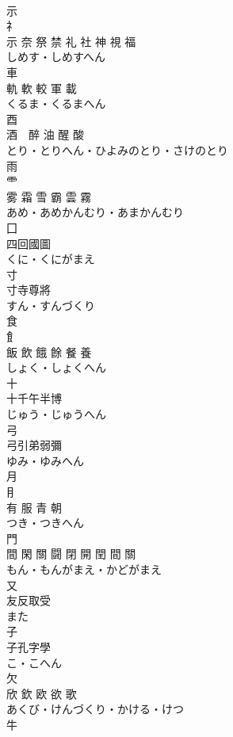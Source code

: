 \documentclass[8pt]{extreport}
\begin{document}
\begin{CJK}{UTF8}{min}
\\	示	
\\	礻 
\\	示 奈 祭 禁 礼 社 神 視 福	
\\	しめす・しめすへん	
\\	車	
\\	軌 軟 較 軍 載	
\\	くるま・くるまへん	
\\	酉	
\\	酒　醉 油 醒 酸	
\\	とり・とりへん・ひよみのとり・さけのとり	
\\	雨	
\\	⻗ 
\\	雾 霜 雪 霸 雲 霧	
\\	あめ・あめかんむり・あまかんむり	
\\	囗	
\\	四回國圖	
\\	くに・くにがまえ	
\\	寸	
\\	寸寺尊將	
\\	すん・すんづくり	
\\	食	
\\	飠 
\\	飯 飲 餓 餘 餐 養	
\\	しょく・しょくへん	
\\	十	
\\	十千午半博	
\\	じゅう・じゅうへん	
\\	弓	
\\	弓引弟弱彌	
\\	ゆみ・ゆみへん	
\\	月	
\\	⺝ 
\\	有 服 青 朝	
\\	つき・つきへん	
\\	門	
\\	間 閑 關 闘 閉 開 閏 間 關	
\\	もん・もんがまえ・かどがまえ	
\\	又	
\\	友反取受	
\\	また	
\\	子	
\\	子孔字學	
\\	こ・こへん	
\\	欠	
\\	欣 欽 欧 欲 歌	
\\	あくび・けんづくり・かける・けつ	
\\	牛	

\end{CJK}
\end{document}
